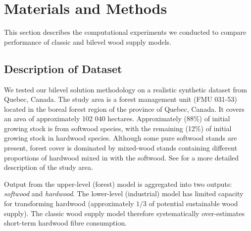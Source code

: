 \section{Materials and Methods}

This section describes the computational experiments we conducted to compare performance of classic and bilevel wood supply models.

\subsection{Description of Dataset}

We tested our bilevel solution methodology on a realistic synthetic dataset from Quebec, Canada.
The study area is a forest management unit (FMU 031-53) located in the boreal forest region of the province of Quebec, Canada. It covers an area of approximately 102 040 hectares. 
Approximately (88\%) of initial growing stock is from softwood species, with the remaining (12\%) of initial growing stock in hardwood species. 
Although some pure softwood stands are present, forest cover is dominated by mixed-wood stands containing different proportions of
hardwood mixed in with the softwood. See \citet{paradis2013risk} for a more detailed description of the study area.

Output from the upper-level (forest) model is aggregated into two outputs: \emph{softwood} and \emph{hardwood}. 
The lower-level (industrial) model has limited capacity for transforming hardwood (approximately $1/3$ of potential sustainable wood supply). 
The classic wood supply model therefore systematically over-estimates short-term hardwood fibre consumption.


